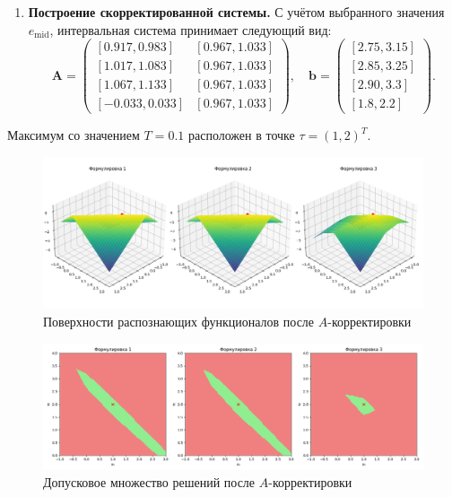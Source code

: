 \documentclass{article}
\begin{document}
\begin{enumerate}
      \item \textbf{Построение скорректированной системы.} С учётом выбранного значения \( e_{\text{mid}} \), интервальная система принимает следующий вид:
      \[
      \mathbf{A} = \begin{pmatrix}
          [0.917, 0.983] & [0.967, 1.033] \\
          [1.017, 1.083] & [0.967, 1.033] \\
          [1.067, 1.133] & [0.967, 1.033] \\
          [-0.033, 0.033] & [0.967, 1.033]
      \end{pmatrix}, \quad
      \mathbf{b} = \begin{pmatrix}
          [2.75, 3.15] \\
          [2.85, 3.25] \\
          [2.90, 3.3] \\
          [1.8, 2.2]
      \end{pmatrix}.
      \]
    \end{enumerate}

  Максимум со значением \( T = 0.1 \) расположен в точке
  \( \tau = (1, 2)^T \).

  \begin{figure}[H]
		\begin{center}
			\includegraphics[width = \textwidth]{tol_a_corrected}
			\caption{Поверхности распознающих функционалов после
        \( A \)-корректировки}
      \label{figure:tol_a_corrected}
		\end{center}
	\end{figure}

  \begin{figure}[H]
		\begin{center}
			\includegraphics[width = \textwidth]{tol_functional_a_corrected}
			\caption{Допусковое множество решений после \( A \)-корректировки}
      \label{figure:tol_functional_a_corrected}
		\end{center}
	\end{figure}
\end{document}
